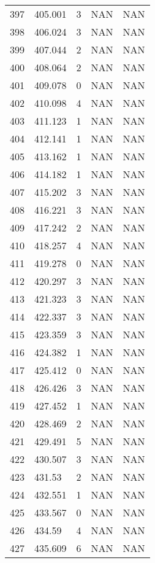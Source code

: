\documentclass{article}
\begin{document}
\begin{longtable}{@{}lllll@{}}
				397 & 405.001 & 3     & NAN   & NAN   \\
				398 & 406.024 & 3     & NAN   & NAN   \\
				399 & 407.044 & 2     & NAN   & NAN   \\
				400 & 408.064 & 2     & NAN   & NAN   \\
				401 & 409.078 & 0     & NAN   & NAN   \\
				402 & 410.098 & 4     & NAN   & NAN   \\
				403 & 411.123 & 1     & NAN   & NAN   \\
				404 & 412.141 & 1     & NAN   & NAN   \\
				405 & 413.162 & 1     & NAN   & NAN   \\
				406 & 414.182 & 1     & NAN   & NAN   \\
				407 & 415.202 & 3     & NAN   & NAN   \\
				408 & 416.221 & 3     & NAN   & NAN   \\
				409 & 417.242 & 2     & NAN   & NAN   \\
				410 & 418.257 & 4     & NAN   & NAN   \\
				411 & 419.278 & 0     & NAN   & NAN   \\
				412 & 420.297 & 3     & NAN   & NAN   \\
				413 & 421.323 & 3     & NAN   & NAN   \\
				414 & 422.337 & 3     & NAN   & NAN   \\
				415 & 423.359 & 3     & NAN   & NAN   \\
				416 & 424.382 & 1     & NAN   & NAN   \\
				417 & 425.412 & 0     & NAN   & NAN   \\
				418 & 426.426 & 3     & NAN   & NAN   \\
				419 & 427.452 & 1     & NAN   & NAN   \\
				420 & 428.469 & 2     & NAN   & NAN   \\
				421 & 429.491 & 5     & NAN   & NAN   \\
				422 & 430.507 & 3     & NAN   & NAN   \\
				423 & 431.53  & 2     & NAN   & NAN   \\
				424 & 432.551 & 1     & NAN   & NAN   \\
				425 & 433.567 & 0     & NAN   & NAN   \\
				426 & 434.59  & 4     & NAN   & NAN   \\
				427 & 435.609 & 6     & NAN   & NAN   \\

\end{longtable}
\end{document}
